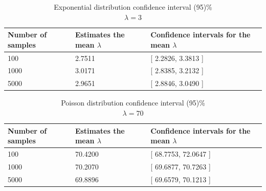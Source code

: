 \documentclass[12pt,a4paper]{article}
\begin{document}
\begin{table}[htbp]
\caption{Exponential distribution confidence interval (95)\% \\ $\lambda=3$} 
\centering
\begin{tabular}{lll}
	\toprule 
	Number of samples & 
	Estimates the mean $\lambda$ & 
	Confidence intervals for the mean $\lambda$ \\ 
	\midrule 
	100 & 2.7511 & [ 2.2826, 3.3813 ] \\ 
	1000 & 3.0171 & [ 2.8385, 3.2132 ] \\
	5000 & 2.9651 & [ 2.8846, 3.0490 ] \\ 
	\bottomrule 
\end{tabular} 
\end{table}

\newpage

\begin{table}[htbp]
\caption{Poisson distribution confidence interval (95)\% \\ $\lambda=70$} 
\centering
\begin{tabular}{lll}
	\toprule 
	Number of samples & 
	Estimates the mean $\lambda$ & 
	Confidence intervals for the mean $\lambda$ \\ 
	\midrule 
	100 & 70.4200 & [ 68.7753, 72.0647 ] \\ 
	1000 & 70.2070 & [ 69.6877, 70.7263 ] \\
	5000 & 69.8896 & [ 69.6579, 70.1213 ] \\ 
	\bottomrule 
\end{tabular} 
\end{table}
\end{document}
